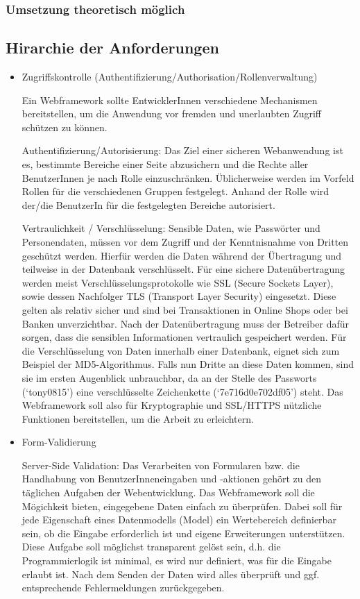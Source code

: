 \documentclass[abstracton, listof=totocnumbered,
bibliography=totocnumbered]{scrreprt}
\begin{document}
  \subsubsection{Umsetzung theoretisch möglich}
    
  \subsection{Hirarchie der Anforderungen}
  
  \begin{itemize}
    \item Zugriffskontrolle (Authentifizierung/Authorisation/Rollenverwaltung)

Ein Webframework sollte EntwicklerInnen verschiedene Mechanismen bereitstellen,
um die Anwendung vor fremden und unerlaubten Zugriff schützen zu können.

Authentifizierung/Autorisierung: Das Ziel einer sicheren Webanwendung ist es,
bestimmte Bereiche einer Seite abzusichern und die Rechte aller BenutzerInnen
je nach Rolle einzuschränken. Üblicherweise werden im Vorfeld Rollen für die
verschiedenen Gruppen festgelegt. Anhand der Rolle wird der/die BenutzerIn für
die festgelegten Bereiche autorisiert.

Vertraulichkeit / Verschlüsselung: Sensible Daten, wie Passwörter und
Personendaten, müssen vor dem Zugriff und der Kenntnisnahme von Dritten
geschützt werden. Hierfür werden die Daten während der Übertragung und
teilweise in der Datenbank verschlüsselt. Für eine sichere Datenübertragung
werden meist Verschlüsselungsprotokolle wie SSL (Secure Sockets Layer), sowie
dessen Nachfolger TLS (Transport Layer Security) eingesetzt. Diese gelten als
relativ sicher und sind bei Transaktionen in Online Shops oder bei Banken
unverzichtbar. Nach der Datenübertragung muss der Betreiber dafür sorgen, dass
die sensiblen Informationen vertraulich gespeichert werden. Für die
Verschlüsselung von Daten innerhalb einer Datenbank, eignet sich zum Beispiel
der MD5-Algorithmus. Falls nun Dritte an diese Daten kommen, sind sie im ersten
Augenblick unbrauchbar, da an der Stelle des Passworts (‘tony0815’) eine
verschlüsselte Zeichenkette (‘7e716d0e702df05’) steht. Das Webframework soll
also für Kryptographie und SSL/HTTPS nützliche Funktionen bereitstellen, um die
Arbeit zu erleichtern.

    \item Form-Validierung

Server-Side Validation: Das Verarbeiten von Formularen bzw. die Handhabung von
BenutzerInneneingaben und -aktionen gehört zu den täglichen Aufgaben der
Webentwicklung. Das Webframework soll die Mögichkeit bieten, eingegebene Daten
einfach zu überprüfen. Dabei soll für jede Eigenschaft eines Datenmodells
(Model) ein Wertebereich definierbar sein, ob die Eingabe erforderlich ist und
eigene Erweiterungen unterstützen. Diese Aufgabe soll möglichst transparent
gelöst sein, d.h. die Programmierlogik ist minimal, es wird nur definiert, was
für die Eingabe erlaubt ist. Nach dem Senden der Daten wird alles überprüft und
ggf. entsprechende Fehlermeldungen zurückgegeben.


\end{itemize}
\end{document}
